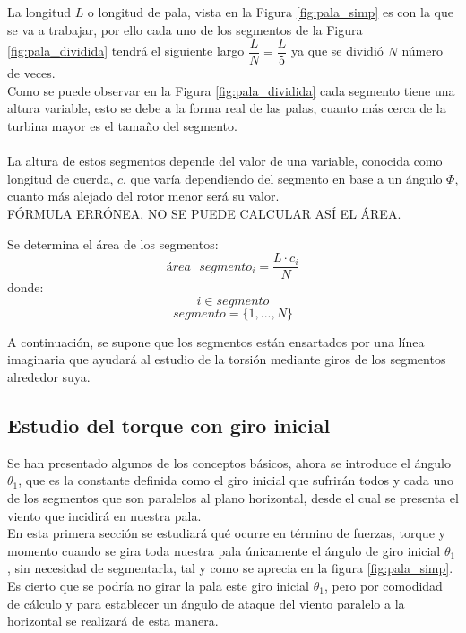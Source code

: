 La longitud $L$ o longitud de pala, vista en la Figura \ref{fig:pala_simp} es con la que se va a trabajar, por ello cada uno de los segmentos de la Figura \ref{fig:pala_dividida} tendrá el siguiente largo $\dfrac{L}{N} = \dfrac{L}{5}$ ya que se dividió $N$ número de veces. \\


Como se puede observar en la Figura \ref{fig:pala_dividida} cada segmento tiene una altura variable, esto se debe a la forma real de las palas, cuanto más cerca de la turbina mayor es el tamaño del segmento. \\\\


La altura de estos segmentos depende del valor de una variable, conocida como longitud de cuerda, $c$, que varía dependiendo del segmento en base a un ángulo $\varPhi$, cuanto más alejado del rotor menor será su valor. \\


FÓRMULA ERRÓNEA, NO SE PUEDE CALCULAR ASÍ EL ÁREA.
\begin{definicion}
Se determina el área de los segmentos:
$$ área \text{ } segmento_{i} = \dfrac{L \cdot c_i}{N} $$
donde:
$$ i \in segmento $$
$$ segmento = \{1, ..., N\}$$
\end{definicion}

A continuación, se supone que los segmentos están ensartados por una línea imaginaria que ayudará al estudio de la torsión mediante giros de los segmentos alrededor suya.


\subsection{Estudio del torque con giro inicial}

Se han presentado algunos de los conceptos básicos, ahora se introduce el ángulo $ \theta_1 $, que es la constante definida como el giro inicial que sufrirán todos y cada uno de los segmentos que son paralelos al plano horizontal, desde el cual se presenta el viento que incidirá en nuestra pala.\\

En esta primera sección se estudiará qué ocurre en término de fuerzas, torque y momento cuando se gira toda nuestra pala únicamente el ángulo de giro inicial $ \theta_1 $, sin necesidad de segmentarla, tal y como se aprecia en la figura \ref{fig:pala_simp}. \\


Es cierto que se podría no girar la pala este giro inicial $ \theta_1 $, pero por comodidad de cálculo y para establecer un ángulo de ataque del viento paralelo a la horizontal se realizará de esta manera.\\


